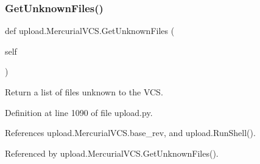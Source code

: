 \subsubsection{\texorpdfstring{Get\+Unknown\+Files()}{GetUnknownFiles()}\hspace{0.1cm}{\footnotesize\ttfamily [1/2]}}
{\footnotesize\ttfamily def upload.\+Mercurial\+V\+C\+S.\+Get\+Unknown\+Files (\begin{DoxyParamCaption}\item[{}]{self }\end{DoxyParamCaption})}

\begin{DoxyVerb}Return a list of files unknown to the VCS.\end{DoxyVerb}
 

Definition at line 1090 of file upload.\+py.



References upload.\+Mercurial\+V\+C\+S.\+base\+\_\+rev, and upload.\+Run\+Shell().



Referenced by upload.\+Mercurial\+V\+C\+S.\+Get\+Unknown\+Files().


